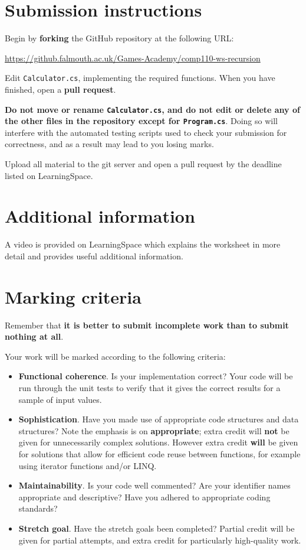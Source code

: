\documentclass{../../../fal_assignment}
\begin{document}
\section*{Submission instructions}

Begin by \textbf{forking} the GitHub repository at the following URL:

\url{https://github.falmouth.ac.uk/Games-Academy/comp110-ws-recursion}

Edit \texttt{Calculator.cs}, implementing the required functions.
When you have finished, open a \textbf{pull request}.

\textbf{Do not move or rename \texttt{Calculator.cs}, and do not edit or delete any of the other files in the repository except for \texttt{Program.cs}}.
Doing so will interfere with the automated testing scripts used to check your submission for correctness,
and as a result may lead to you losing marks.

Upload all material to the git server and open a pull request by the deadline listed on LearningSpace.

\section*{Additional information}

A video is provided on LearningSpace which explains the worksheet in more detail and provides useful additional information.

\section*{Marking criteria}

Remember that \textbf{it is better to submit incomplete work than to submit nothing at all}.

Your work will be marked according to the following criteria:
\begin{itemize}
	\item \textbf{Functional coherence}. Is your implementation correct?
		Your code will be run through the unit tests to verify that it gives the correct results for a sample of input values.
	\item \textbf{Sophistication}. Have you made use of appropriate code structures and data structures?
		Note the emphasis is on \textbf{appropriate}; extra credit will \textbf{not} be given for unnecessarily complex solutions.
		However extra credit \textbf{will} be given for solutions that allow for efficient code reuse between functions,
		for example using iterator functions and/or LINQ.
	\item \textbf{Maintainability}. Is your code well commented? Are your identifier names appropriate and descriptive?
		Have you adhered to appropriate coding standards?
	\item \textbf{Stretch goal}. Have the stretch goals been completed? Partial credit will be given for partial attempts,
		and extra credit for particularly high-quality work.
\end{itemize}
\end{document}
